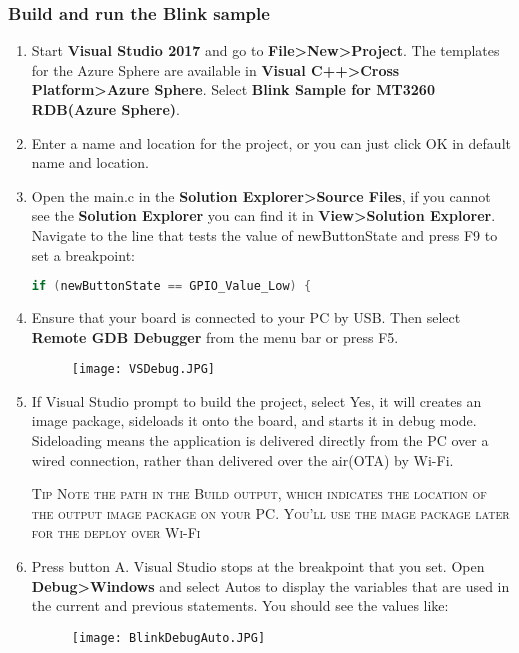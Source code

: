 \subsubsection{Build and run the Blink sample}
\begin{enumerate}
    \item Start \textbf{Visual Studio 2017} and go to \textbf{File>New>Project}. The templates for the Azure Sphere are available in \textbf{Visual C++>Cross Platform>Azure Sphere}. Select \textbf{Blink Sample for MT3260 RDB(Azure Sphere)}.
    
    \item Enter a name and location for the project, or you can just click OK in default name and location.
    
    \item Open the main.c in the \textbf{Solution Explorer>Source Files}, if you cannot see the \textbf{Solution Explorer} you can find it in \textbf{View>Solution Explorer}. Navigate to the line that tests the value of newButtonState and press F9 to set a breakpoint:
    \begin{lstlisting}[language=c]
    if (newButtonState == GPIO_Value_Low) {
    \end{lstlisting}
    
    \item Ensure that your board is connected to your PC by USB. Then select \textbf{Remote GDB Debugger} from the menu bar or press F5.
    \begin{figure}[h]
        \centering
        \texttt{[image: VSDebug.JPG]}
    \end{figure}
    
    \item If Visual Studio prompt to build the project, select Yes, it will creates an image package, sideloads it onto the board, and starts it in debug mode. Sideloading means the application is delivered directly from the PC over a wired connection, rather than delivered over the air(OTA) by Wi-Fi.
    \begin{tcolorbox}
    \textsc{Tip \newline\newline Note the path in the Build output, which indicates the location of the output image package on your PC. You'll use the image package later for the deploy over Wi-Fi}
    \end{tcolorbox}
    
    \item Press button A. Visual Studio stops at the breakpoint that you set. Open \textbf{Debug>Windows} and select Autos to display the variables that are used in the current and previous statements. You should see the values like:
        \begin{figure}[h]
            \centering
            \texttt{[image: BlinkDebugAuto.JPG]}
        \end{figure}
    

\end{enumerate}
